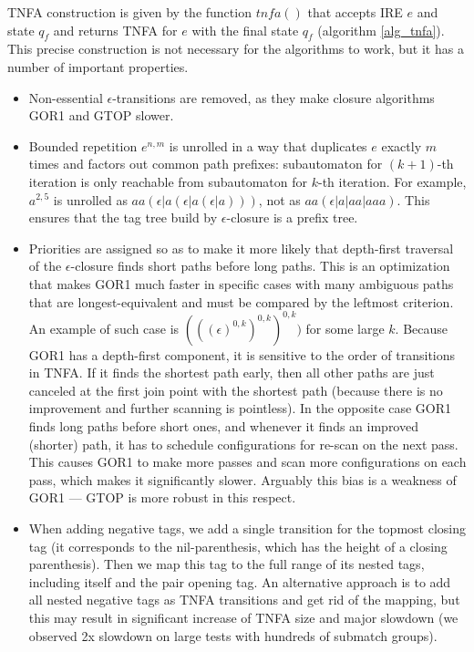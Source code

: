 \documentclass[AMA,STIX1COL]{WileyNJD-v2}
\begin{document}
TNFA construction is given by the function $tn\!f\!a()$
that accepts IRE $e$ and state $q_f$ and returns TNFA for $e$ with the final state $q_f$
(algorithm \ref{alg_tnfa}).
%
This precise construction is not necessary for the algorithms to work,
but it has a number of important properties.
\begin{itemize}[itemsep=0.2em, topsep=0.5em]
    \item Non-essential $\epsilon$-transitions are removed, as they make closure algorithms GOR1 and GTOP slower.

    \item Bounded repetition $e^{n,m}$ is unrolled in a way
        that duplicates $e$ exactly $m$ times
        and factors out common path prefixes:
        subautomaton for $(k+1)$-th iteration is only reachable from subautomaton for $k$-th iteration.
        For example, $a^{2,5}$ is unrolled as $aa(\epsilon | a (\epsilon | a (\epsilon | a)))$, not as $aa(\epsilon|a|aa|aaa)$.
        This ensures that the tag tree build by $\epsilon$-closure is a prefix tree.

    \item Priorities are assigned so as to make it more likely
        that depth-first traversal of the $\epsilon$-closure finds short paths before long paths.
        This is an optimization that makes GOR1 much faster in specific cases
        with many ambiguous paths that are longest-equivalent and must be compared by the leftmost criterion.
        An example of such case is $(((\epsilon)^{0,k})^{0,k})^{0,k})$ for some large $k$.
        Because GOR1 has a depth-first component, it is sensitive to the order of transitions in TNFA.
        If it finds the shortest path early, then all other paths are just canceled at the first join point with the shortest path
        (because there is no improvement and further scanning is pointless).
        In the opposite case GOR1 finds long paths before short ones,
        and whenever it finds an improved (shorter) path, it has to schedule configurations for re-scan on the next pass.
        This causes GOR1 to make more passes and scan more configurations on each pass,
        which makes it significantly slower.
        Arguably this bias is a weakness of GOR1 --- GTOP is more robust in this respect.

    \item When adding negative tags, we add a single transition for the topmost closing tag
        (it corresponds to the nil-parenthesis, which has the height of a closing parenthesis).
        Then we map this tag to the full range of its nested tags, including itself and the pair opening tag.
        An alternative approach is to add all nested negative tags as TNFA transitions and get rid of the mapping,
        but this may result in significant increase of TNFA size and major slowdown
        (we observed 2x slowdown on large tests with hundreds of submatch groups).


\end{itemize}
\end{document}
